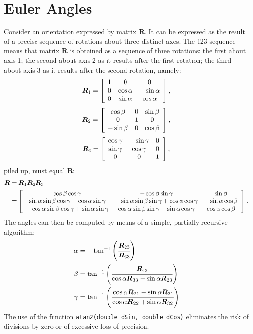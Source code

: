 \documentclass[10pt,dvips,fleqn]{report}
\newcommand{\T}[1]{\boldsymbol{#1}}
\begin{document}
\section{Euler Angles}
Consider an orientation expressed by matrix $\T{R}$.
It can be expressed as the result of a precise sequence of rotations 
about three distinct axes.
The 123 sequence means that matrix $\T{R}$ is obtained as a sequence
of three rotations: the first about axis 1; the second about axis 2
as it results after the first rotation; the third about axis 3
as it results after the second rotation, namely:
\begin{equation}
	\T{R}_1 = \sqbr{\matr{ccc}{
		1 & 0 & 0 \\
		0 & \cos\alpha & -\sin\alpha \\
		0 & \sin\alpha & \cos\alpha
	}} ,
\end{equation}
\begin{equation}
	\T{R}_2 = \sqbr{\matr{ccc}{
		\cos\beta & 0 & \sin\beta \\
		0 & 1 & 0 \\
		-\sin\beta & 0 & \cos\beta
	}} ,
\end{equation}
\begin{equation}
	\T{R}_3 = \sqbr{\matr{ccc}{
		\cos\gamma & -\sin\gamma & 0 \\
		\sin\gamma & \cos\gamma & 0 \\
		0 & 0 & 1
	}} ,
\end{equation}
piled up, must equal $\T{R}$:
\begin{align}
	\T{R} &= \T{R}_1 \T{R}_2 \T{R}_3 \\
	&= \sqbr{\matr{ccc}{
		\cos\beta \cos\gamma
		& -\cos\beta \sin\gamma
		& \sin\beta \\
		\sin\alpha \sin\beta \cos\gamma + \cos\alpha \sin\gamma
		& -\sin\alpha \sin\beta \sin\gamma + \cos\alpha \cos\gamma
		& -\sin\alpha \cos\beta \\
		-\cos\alpha \sin\beta \cos\gamma + \sin\alpha \sin\gamma
		& \cos\alpha \sin\beta \sin\gamma + \sin\alpha \cos\gamma
		& \cos\alpha \cos\beta
	}} \nonumber .
\end{align}
The angles can then be computed by means of a simple, 
partially recursive algorithm:
\begin{align}
	\alpha &= - \tan^{-1}\plbr{\cfrac{\T{R}_{23}}{\T{R}_{33}}} \\
	\beta &= \tan^{-1}\plbr{\cfrac{\T{R}_{13}}{
			\cos\alpha \T{R}_{33} - \sin\alpha \T{R}_{23}
		}} \\
	\gamma &= \tan^{-1}\plbr{\cfrac{
		\cos\alpha \T{R}_{21} + \sin\alpha \T{R}_{31}
	}{
		\cos\alpha \T{R}_{22} + \sin\alpha \T{R}_{32}
	}}
\end{align}
The use of the function \texttt{atan2(double dSin, double dCos)}
eliminates the risk of divisions by zero or of excessive loss of precision.
\end{document}
